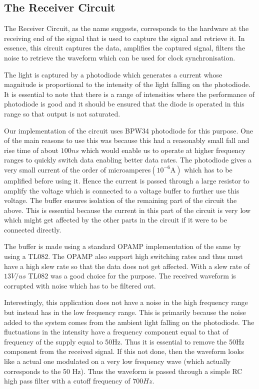 \documentclass{article}
\begin{document}


\subsection{The Receiver Circuit}
The Receiver Circuit, as the name suggests, corresponds to the hardware at the receiving end of the signal that is used to capture the signal and retrieve it. In essence, this circuit captures the data, amplifies the captured signal, filters the noise to retrieve the waveform which can be used for clock synchronisation.

The light is captured by a photodiode which generates a current whose magnitude is proportional to the intensity of the light falling on the photodiode. It is essential to note that there is a range of intensities where the performance of photodiode is good and it should be ensured that the diode is operated in this range so that output is not saturated.

Our implementation of the circuit uses BPW34 photodiode for this purpose. One of the main reasons to use this was because this had a reasonably small fall and rise time of about $100ns$ which would enable us to operate at higher frequency ranges to quickly switch data enabling better data rates. The photodiode gives a very small current of the order of microamperes$(10^{-6}\text{A})$ which has to be amplified before using it. Hence the current is passed through a large resistor to amplify the voltage which is connected to a voltage buffer to further use this voltage. The buffer ensures isolation of the remaining part of the circuit the above. This is essential because the current in this part of the circuit is very low which might get affected by the other parts in the circuit if it were to be connected directly.

The buffer is made using a standard OPAMP implementation of the same by using a TL082. The OPAMP also support high switching rates and thus must have a high slew rate so that the data does not get affected. With a slew rate of $13V/us$ TL082 was a good choice for the purpose. The received waveform is corrupted with noise which has to be filtered out.

Interestingly, this application does not have a noise in the high frequency range but instead has in the low frequency range. This is primarily because the noise added to the system comes from the ambient light falling on the photodiode. The fluctuations in the intensity have a frequency component equal to that of frequency of the supply equal to 50Hz. Thus it is essential to remove the 50Hz component from the received signal. If this not done, then the waveform looks like a actual one modulated on a very low frequency wave (which actually corresponds to the 50 Hz).  Thus the waveform is passed through a simple RC high pass filter with a cutoff frequency of $700 Hz$.
\end{document}
